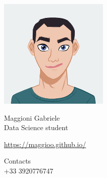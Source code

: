 \documentclass{article}
\begin{document}
\centering \includegraphics[width=.25\linewidth]{AvatarMaker}\\[5pt]
\parbox{2in}{\Large \centering Maggioni Gabriele\\[1pt]
\normalsize Data Science student}

\vfill
\raggedright
\begin{multicols}{2}
\url{https://maggioo.github.io/}

\columnbreak
\raggedleft
Contacts\\
+33 3920776747%
\end{multicols}%
\end{document}
